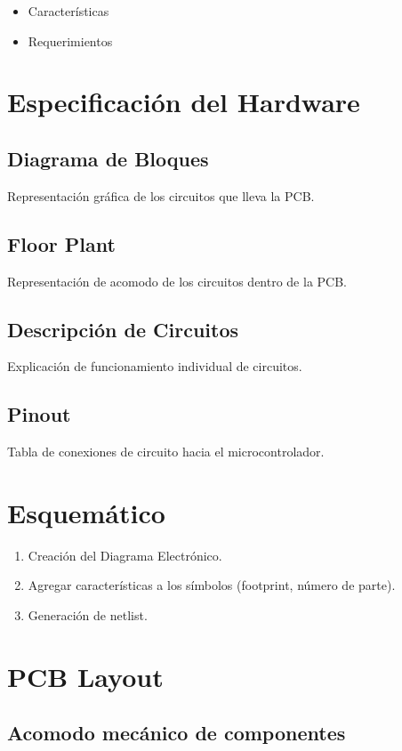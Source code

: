 \documentclass[9pt,a4paper,twocolumn,twoside]{tau-class/tau}
\begin{document}
    \begin{itemize}
    		\item Características
    		\item Requerimientos
    \end{itemize}

\section{Especificación del Hardware}

\subsection{Diagrama de Bloques}
Representación gráfica de los circuitos que lleva la PCB.

\subsection{Floor Plant}
Representación de acomodo de los circuitos dentro de la PCB.

\subsection{Descripción de Circuitos}
Explicación de funcionamiento individual de circuitos.

\subsection{Pinout}
Tabla de conexiones de circuito hacia el microcontrolador.

\section{Esquemático}

\begin{enumerate}
	\item Creación del Diagrama Electrónico.
	\item Agregar características a los símbolos (footprint, número de parte).
	\item Generación de netlist.
\end{enumerate}


\section{PCB Layout}

\subsection{Acomodo mecánico de componentes}
\end{document}
